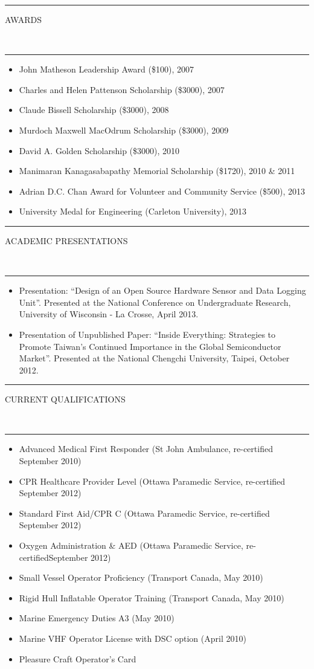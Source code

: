 \documentclass[10pt, letterpaper, oneside]{article}
\newcommand{\HRule}[2]{\textcolor{#1}{\rule{\linewidth}{#2}}}
\newcommand{\sectiontitle}[1]{\begin{minipage}{\textwidth}\HRule{black}{0.25mm}\vspace{-10pt}\begin{center}\Large\MakeUppercase{#1}\end{center}\end{minipage}\\\HRule{light-grey}{0.15mm}\vspace{\baselineskip}}
\newenvironment{tightressection}[1]{
  \begin{minipage}{\textwidth}
  \sectiontitle{#1}}
  {\vspace{\baselineskip}\end{minipage}}
\newenvironment{rescolumn}{
  \begin{minipage}{0.5\textwidth}
    \begin{itemize}[noitemsep,nolistsep]}
  {\end{itemize}
    \end{minipage}}
\newcommand{\resitem}[1]{
	\vspace{2pt}
	\item \begin{flushleft} #1 \end{flushleft}
}
\begin{document}
\begin{tightressection}{awards}
  \begin{rescolumn}
      \resitem{John Matheson Leadership Award (\$100), 2007}
      \resitem{Charles and Helen Pattenson Scholarship (\$3000), 2007}
      \resitem{Claude Bissell Scholarship (\$3000), 2008}
      \resitem{Murdoch Maxwell MacOdrum Scholarship (\$3000), 2009}
    \end{rescolumn}
  \begin{rescolumn}
      \resitem{David A. Golden Scholarship (\$3000), 2010}
      \resitem{Manimaran Kanagasabapathy Memorial Scholarship (\$1720), 2010 \& 2011}
      \resitem{Adrian D.C. Chan Award for Volunteer and Community Service (\$500), 2013}
      \resitem{University Medal for Engineering (Carleton University), 2013}
    \end{rescolumn}
\end{tightressection}

\begin{tightressection}{academic presentations}
  \begin{itemize}[noitemsep,nolistsep]
    \resitem{Presentation: ``Design of an Open Source Hardware Sensor and Data Logging Unit''.  Presented at the National Conference on Undergraduate Research, University of Wisconsin - La Crosse, April 2013.}
    \resitem{Presentation of Unpublished Paper: ``Inside Everything: Strategies to Promote Taiwan's Continued Importance in the Global Semiconductor Market''. Presented at the National Chengchi University, Taipei, October 2012.}
  \end{itemize}
\end{tightressection}

\begin{tightressection}{current qualifications}
  \begin{rescolumn}
      \resitem{Advanced Medical First Responder (St John Ambulance, re-certified September 2010)}
      \resitem{CPR Healthcare Provider Level (Ottawa Paramedic Service, re-certified September 2012)}
      \resitem{Standard First Aid/CPR C (Ottawa Paramedic Service, re-certified September 2012)}
      \resitem{Oxygen Administration \& AED (Ottawa Paramedic Service, re-certifiedSeptember 2012)}
    \end{rescolumn}
  \begin{rescolumn}
      \resitem{Small Vessel Operator Proficiency (Transport Canada, May 2010)}
      \resitem{Rigid Hull Inflatable Operator Training (Transport Canada, May 2010)}
      \resitem{Marine Emergency Duties A3 (May 2010)}
      \resitem{Marine VHF Operator License with DSC option (April 2010)}
      \resitem{Pleasure Craft Operator's Card}
    \end{rescolumn}
\end{tightressection}
\end{document}
